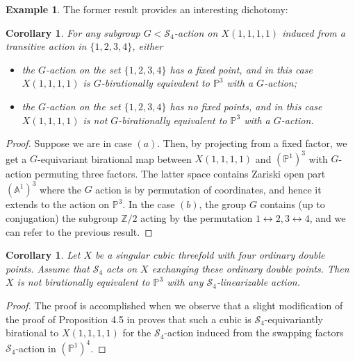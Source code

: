 \documentclass[12pt,a4paper]{amsart}
\newtheorem{corollary}[theorem]{Corollary}
\theoremstyle{definition}
\newtheorem{example}[theorem]{Example}
\theoremstyle{remark}
\newcommand{\Z}{\mathbb{Z}}
\newcommand{\PP}{\mathbb{P}}
\begin{document}
\begin{example}
The former result provides an interesting dichotomy:
\begin{corollary}\label{thm:X(1,1,1,1)}
For any subgroup $G<\mathcal S_4$-action on $X(1,1,1,1)$ induced from a transitive action in $\{1, 2, 3, 4\}$, either
\begin{itemize}
\item[{\parbox[t]{2.5em}{(a)}}]%
\hspace{0.5em}the $G$-action on the set $\{1,2,3,4\}$ has a fixed point, and in this case $X(1,1,1,1)$ is $G$-birationally equivalent to 
$\mathbb P^3$ with a $G$-action;
\item[{\parbox[t]{2.5em}{(b)}}]%
\hspace{0.5em}the $G$-action on the set $\{1,2,3,4\}$ has no fixed points, and in this case $X(1,1,1,1)$ is not $G$-birationally equivalent to $\mathbb P^3$ with a $G$-action.
\end{itemize}
\end{corollary}
\begin{proof} 
Suppose we are in case $(a)$. Then, by projecting from a fixed factor, we get a $G$-equivariant birational map between $X(1,1,1,1)$ and $(\PP^1)^3$ with $G$-action permuting three factors. The latter space contains Zariski open part $(\mathbb A^1)^3$ where the $G$ action is by permutation of coordinates, and hence it extends to the action on $\mathbb P^3$. In the case $(b)$, the group $G$ contains (up to conjugation) the subgroup $\Z/2$ acting by the permutation $1\leftrightarrow 2, 3\leftrightarrow 4$, and we can refer to the previous result. \qedhere

\end{proof}

\begin{corollary}\label{cor:Kuznetsov}
    Let $X$ be a singular cubic threefold with four ordinary double points. Assume that $\mathcal S_4$ acts on $X$ exchanging these ordinary double points. Then $X$ is not birationally equivalent to $\mathbb P^3$ with \emph{any} $\mathcal S_4$-linearizable action.
\end{corollary}
\begin{proof}
The proof is accomplished when we observe that a slight modification of the proof of Proposition 4.5 in \cite{Kuznetsov_Prokhorov_2024} proves that such a cubic is $\mathcal S_4$-equivariantly birational to \(X(1,1,1,1)\) for the \(\mathcal S_4\)-action induced from the swapping factors \(\mathcal S_4\)-action in \((\PP^1)^4\).
\end{proof}
\end{example}
\end{document}

